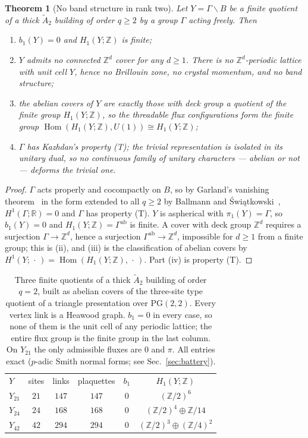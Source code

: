 \documentclass[aps,prb,reprint,amsmath,amssymb,floatfix,superscriptaddress]{revtex4-2}
\theoremstyle{plain}
\newtheorem{theorem}{Theorem}
\theoremstyle{definition}
\theoremstyle{remark}
\newcommand{\Z}{\mathbb{Z}}
\newcommand{\R}{\mathbb{R}}
\newcommand{\Atwo}{\widetilde A_2}
\newcommand{\Hom}{\operatorname{Hom}}
\begin{document}
\begin{theorem}[No band structure in rank two]\label{thm:nogo}
Let $Y=\Gamma\backslash B$ be a finite quotient of a thick $\Atwo$ building of order
$q\ge2$ by a group $\Gamma$ acting freely. Then
\begin{enumerate}
\item[(i)] $b_1(Y)=0$ and $H_1(Y;\Z)$ is finite;
\item[(ii)] $Y$ admits no connected $\Z^{d}$ cover for any $d\ge1$. There is no
$\Z^{d}$-periodic lattice with unit cell $Y$, hence no Brillouin zone, no crystal momentum,
and no band structure;
\item[(iii)] the abelian covers of $Y$ are exactly those with deck group a quotient of the
finite group $H_1(Y;\Z)$, so the threadable flux configurations form the finite group
$\Hom(H_1(Y;\Z),U(1))\cong H_1(Y;\Z)$;
\item[(iv)] $\Gamma$ has Kazhdan's property (T); the trivial representation is isolated in
its unitary dual, so no continuous family of unitary characters --- abelian or not ---
deforms the trivial one.
\end{enumerate}
\end{theorem}

\begin{proof}
$\Gamma$ acts properly and cocompactly on $B$, so by Garland's vanishing
theorem~\cite{Ga} in the form extended to all $q\ge2$ by Ballmann and
\'Swi\k{a}tkowski~\cite{BSw}, $H^{1}(\Gamma;\R)=0$ and $\Gamma$ has property (T). $Y$ is
aspherical with $\pi_1(Y)=\Gamma$, so $b_1(Y)=0$ and $H_1(Y;\Z)=\Gamma^{\mathrm{ab}}$ is
finite. A cover with deck group $\Z^{d}$ requires a surjection $\Gamma\to\Z^{d}$, hence a
surjection $\Gamma^{\mathrm{ab}}\to\Z^{d}$, impossible for $d\ge1$ from a finite group; this
is (ii), and (iii) is the classification of abelian covers by
$H^{1}(Y;\,\cdot\,)=\Hom(H_1(Y;\Z),\,\cdot\,)$. Part (iv) is property (T).
\end{proof}

\begin{table}[t]
\centering
\begin{ruledtabular}
\begin{tabular}{lccccc}
$Y$ & sites & links & plaquettes & $b_1$ & $H_1(Y;\Z)$\\
\colrule
$Y_{21}$ & $21$ & $147$ & $147$ & $0$ & $(\Z/2)^{6}$\\
$Y_{24}$ & $24$ & $168$ & $168$ & $0$ & $(\Z/2)^{4}\oplus\Z/14$\\
$Y_{42}$ & $42$ & $294$ & $294$ & $0$ & $(\Z/2)^{3}\oplus(\Z/4)^{2}$\\
\end{tabular}
\end{ruledtabular}
\caption{Three finite quotients of a thick $\Atwo$ building of order $q=2$, built as
abelian covers of the three-site type quotient of a triangle presentation over
$\mathrm{PG}(2,2)$. Every vertex link is a Heawood graph. $b_1=0$ in every case, so none of
them is the unit cell of any periodic lattice; the entire flux group is the finite group in
the last column. On $Y_{21}$ the only admissible fluxes are $0$ and $\pi$. All entries
exact ($p$-adic Smith normal forms; see Sec.~\ref{sec:battery}).}
\label{tab:ranktwo}
\end{table}
\end{document}
